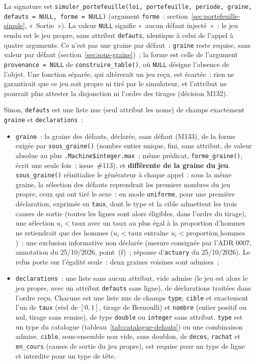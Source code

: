 \documentclass[a4paper,11pt]{article}
\newcommand{\code}[1]{\texttt{\small #1}}
\begin{document}
{\sloppy{} La signature est
\code{simuler\_portefeuille(loi, portefeuille, periode, graine, defauts = NULL, forme = NULL)}
(argument \code{forme}~: section~\ref{sec:portefeuille-simule}, «~Sortie~»).
La valeur \code{NULL} signifie «~aucun défaut injecté~»~: le jeu rendu est
le jeu propre, sans attribut \code{defauts}, identique à celui de l'appel à
quatre arguments. Ce n'est pas une graine par défaut~: \code{graine} reste
requise, sans valeur par défaut (section~\ref{sec:sous-graine})~; la forme
est celle de l'argument \code{provenance = NULL} de
\code{construire\_table()}, où \code{NULL} désigne l'absence de l'objet. Une
fonction séparée, qui altérerait un jeu reçu, est écartée~: rien ne
garantirait que ce jeu soit propre ni tiré par le simulateur, et
l'attribut ne pourrait plus attester la disjonction ni l'ordre des tirages
(décision M132).\par}

\medskip
Sinon, \code{defauts} est une liste nue (seul attribut les noms) de champs
exactement \code{graine} et \code{declarations}~:

\begin{itemize}[leftmargin=*, itemsep=2pt]
  \item \code{graine}~: la graine des défauts, déclarée, sans défaut
    (M133), de la forme exigée par \code{sous\_graine()} (nombre entier
    unique, fini, sans attribut, de valeur absolue au plus
    \code{.Machine\$integer.max}~; même prédicat, \code{forme\_graine()},
    écrit une seule fois~; issue~\#113), et \textbf{différente de la graine du
    jeu}. \code{sous\_graine()} réinitialise le générateur à chaque appel~:
    sous la même graine, la sélection des défauts reprendrait les premiers
    nombres du jeu propre, ceux qui ont tiré le sexe~: en mode
    \code{uniforme}, pour une première déclaration, exprimée en
    \code{taux}, dont le type et la cible admettent les trois causes de
    sortie (toutes les lignes sont alors éligibles, dans l'ordre du
    tirage), une sélection $u_i < \text{taux}$ avec un taux au plus égal à la
    proportion d'hommes ne retiendrait que des hommes ($u_i < \text{taux}$
    entraîne $u_i < \text{proportion\_hommes}$)~: une exclusion informative
    non déclarée (mesure consignée par l'ADR 0007,
    annotation du 25/10/2026, point~(f)~; réponse d'\code{actuary} du
    25/10/2026). Le refus porte sur l'égalité seule~: deux graines voisines
    sont admises~;
  \item \code{declarations}~: une liste sans aucun attribut, vide admise
    (le jeu est alors le jeu propre, avec un attribut \code{defauts} sans
    ligne), de déclarations traitées dans l'ordre reçu. Chacune est une
    liste nue de champs \code{type}, \code{cible} et exactement l'un de
    \code{taux} (réel de $[0, 1]$, tirage de Bernoulli) et \code{nombre}
    (entier positif ou nul, tirage sans remise), de type \code{double} ou
    \code{integer} sans attribut. \code{type} est un type du catalogue
    (tableau~\ref{tab:catalogue-defauts}) ou une combinaison admise.
    \code{cible}, sous-ensemble non vide, sans doublon, de \code{deces},
    \code{rachat} et \code{en\_cours} (causes de sortie du jeu propre), est
    requise pour un type de ligne et interdite pour un type de tête.
\end{itemize}
\end{document}
